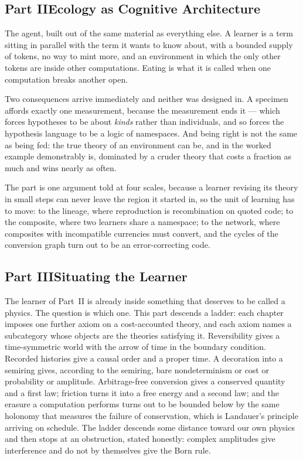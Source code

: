 \documentclass[12pt,openright,twoside]{book}
\theoremstyle{remark}
\theoremstyle{plain}
\theoremstyle{remark}
\theoremstyle{plain}
\theoremstyle{plain}
\begin{document}
\subsection*{Part II\quad Ecology as Cognitive Architecture}

The agent, built out of the same material as everything else.
A learner is a term sitting in parallel with the term it wants to know
about, with a bounded supply of tokens, no way to mint more, and an
environment in which the only other tokens are inside other computations.
Eating is what it is called when one computation breaks another open.

Two consequences arrive immediately and neither was designed in.
A specimen affords exactly one measurement, because the measurement ends
it --- which forces hypotheses to be about \emph{kinds} rather than
individuals, and so forces the hypothesis language to be a logic of
namespaces.
And being right is not the same as being fed: the true theory of an
environment can be, and in the worked example demonstrably is, dominated
by a cruder theory that costs a fraction as much and wins nearly as
often.

The part is one argument told at four scales, because a learner revising
its theory in small steps can never leave the region it started in, so
the unit of learning has to move: to the lineage, where reproduction is
recombination on quoted code; to the composite, where two learners share
a namespace; to the network, where composites with incompatible
currencies must convert, and the cycles of the conversion graph turn out
to be an error-correcting code.

\subsection*{Part III\quad Situating the Learner}

The learner of Part~II is already inside something that deserves to be
called a physics.
The question is which one.
This part descends a ladder: each chapter imposes one further axiom on a
cost-accounted theory, and each axiom names a subcategory whose objects
are the theories satisfying it.
Reversibility gives a time-symmetric world with the arrow of time in the
boundary condition.
Recorded histories give a causal order and a proper time.
A decoration into a semiring gives, according to the semiring, bare
nondeterminism or cost or probability or amplitude.
Arbitrage-free conversion gives a conserved quantity and a first law;
friction turns it into a free energy and a second law; and the erasure a
computation performs turns out to be bounded below by the same holonomy
that measures the failure of conservation, which is Landauer's principle
arriving on schedule.
The ladder descends some distance toward our own physics and then stops
at an obstruction, stated honestly: complex amplitudes give interference
and do not by themselves give the Born rule.
\end{document}
